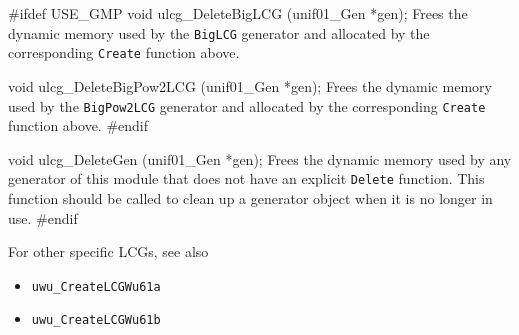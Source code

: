 \code


#ifdef USE_GMP
   void ulcg_DeleteBigLCG (unif01_Gen *gen);
\endcode
 \tab  Frees the dynamic memory used by the {\tt BigLCG}
  generator and allocated by the corresponding {\tt Create} function
 above.
 \endtab
\code


   void ulcg_DeleteBigPow2LCG (unif01_Gen *gen);
\endcode
 \tab  Frees the dynamic memory used by the {\tt BigPow2LCG}
  generator and allocated by the corresponding {\tt Create} function
  above.
 \endtab
\code
#endif


void ulcg_DeleteGen (unif01_Gen *gen);
\endcode
 \tab Frees the dynamic memory used by any generator of this module
  that does not have an explicit {\tt Delete} function. 
  This function should be called to clean up a generator object
  when it is no longer in use.
 \endtab
\code
\hide
#endif
\endhide
\endcode


{ For other specific LCGs, see also

\begin{itemize}
\item {\tt uwu\_CreateLCGWu61a}
\item {\tt uwu\_CreateLCGWu61b}
\end{itemize}
}
